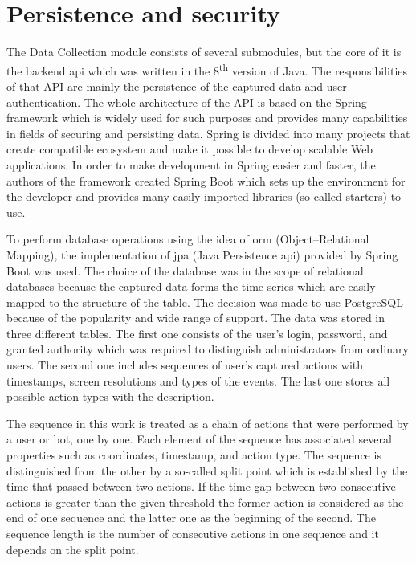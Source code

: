 \section{Persistence and security}\label{sec:persistence-and-security}
The Data Collection module consists of several submodules, but the core of it is the backend \gls{api} which was written in the 8\textsuperscript{th} version of Java.
The responsibilities of that API are mainly the persistence of the captured data and user authentication.
The whole architecture of the API is based on the Spring framework which is widely used for such purposes and provides many capabilities in fields of securing and persisting data.
Spring is divided into many projects that create compatible ecosystem and make it possible to develop scalable Web applications.
In order to make development in Spring easier and faster, the authors of the framework created Spring Boot which sets up the environment for the developer and provides many easily imported libraries (so-called starters) to use.

To perform database operations using the idea of \gls{orm} (Object–Relational Mapping), the implementation of \gls{jpa} (Java Persistence \gls{api}) provided by Spring Boot was used.
The choice of the database was in the scope of relational databases because the captured data forms the time series which are easily mapped to the structure of the table.
The decision was made to use PostgreSQL because of the popularity and wide range of support.
The data was stored in three different tables.
The first one consists of the user's login, password, and granted authority which was required to distinguish administrators from ordinary users.
The second one includes sequences of user's captured actions with timestamps, screen resolutions and types of the events.
The last one stores all possible action types with the description.

The sequence in this work is treated as a chain of actions that were performed by a user or bot, one by one.
Each element of the sequence has associated several properties such as coordinates, timestamp, and action type.
The sequence is distinguished from the other by a so-called split point which is established by the time that passed between two actions.
If the time gap between two consecutive actions is greater than the given threshold the former action is considered as the end of one sequence and the latter one as the beginning of the second.
The sequence length is the number of consecutive actions in one sequence and it depends on the split point.

